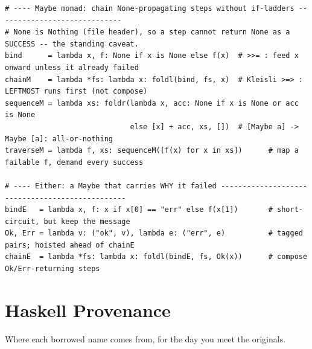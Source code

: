 \documentclass[11pt,letterpaper]{book}
\begin{document}
\begin{lstlisting}[style=file]
# ---- Maybe monad: chain None-propagating steps without if-ladders -----------------------------
# None is Nothing (file header), so a step cannot return None as a SUCCESS -- the standing caveat.
bind      = lambda x, f: None if x is None else f(x)  # >>= : feed x onward unless it already failed
chainM    = lambda *fs: lambda x: foldl(bind, fs, x)  # Kleisli >=> : LEFTMOST runs first (not compose)
sequenceM = lambda xs: foldr(lambda x, acc: None if x is None or acc is None
                             else [x] + acc, xs, [])  # [Maybe a] -> Maybe [a]: all-or-nothing
traverseM = lambda f, xs: sequenceM([f(x) for x in xs])      # map a failable f, demand every success

# ---- Either: a Maybe that carries WHY it failed ------------------------------------------------
bindE   = lambda x, f: x if x[0] == "err" else f(x[1])       # short-circuit, but keep the message
Ok, Err = lambda v: ("ok", v), lambda e: ("err", e)          # tagged pairs; hoisted ahead of chainE
chainE  = lambda *fs: lambda x: foldl(bindE, fs, Ok(x))      # compose Ok/Err-returning steps
\end{lstlisting}
\chapter{Haskell Provenance}
Where each borrowed name comes from, for the day you meet the originals.
\end{document}
